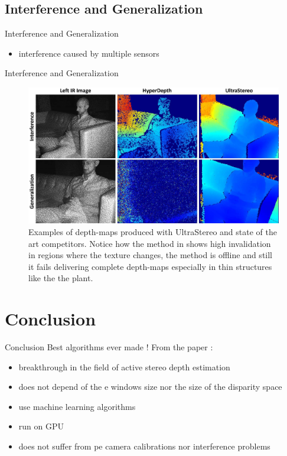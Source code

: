 \subsection{Interference and Generalization}
\begin{frame}{Interference and Generalization}
\begin{itemize}
\item interference caused by multiple sensors
\end{itemize}
\end{frame}

\begin{frame}{Interference and Generalization}
\begin{figure}
\includegraphics[scale=0.1]{pictures/fig8}
\caption{Examples of depth-maps produced with UltraStereo and state of the art competitors. Notice how the method in shows high invalidation in regions where the texture changes, the method is offline and still it fails delivering complete depth-maps especially in thin structures like the the plant.}
\end{figure}
\end{frame}

\section{Conclusion}
\begin{frame}{Conclusion}
Best algorithms ever made !
From the paper :
\begin{itemize}
\item breakthrough in the field of active stereo depth estimation 
\item does not depend of the e windows size nor the size of the disparity space
\item use machine learning algorithms
\item run on GPU
\item does not suffer from pe camera calibrations nor interference problems
\end{itemize}
\end{frame}
